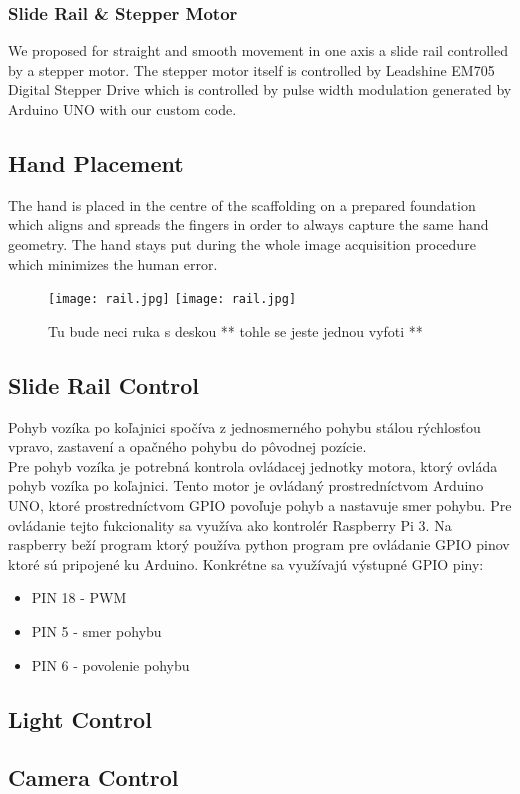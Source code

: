 \subsubsection*{Slide Rail \& Stepper Motor}
We proposed for straight and smooth movement in one axis a slide rail controlled by a stepper motor. The stepper motor itself is controlled by Leadshine EM705 Digital Stepper Drive which is controlled by pulse width modulation generated by Arduino UNO with our custom code.

\subsection{Hand Placement}
The hand is placed in the centre of the scaffolding on a prepared foundation which aligns and spreads the fingers in order to always capture the same hand geometry. The hand stays put during the whole image acquisition procedure which minimizes the human error.

\begin{figure}[h]
    \label{fig:rail}
    \texttt{[image: rail.jpg]}
    \texttt{[image: rail.jpg]}
    \caption{Tu bude neci ruka s deskou ** tohle se jeste jednou vyfoti **}
\end{figure}


\subsection{Slide Rail Control}
Pohyb vozíka po koľajnici spočíva z jednosmerného pohybu stálou rýchlosťou vpravo, zastavení a opačného pohybu do pôvodnej pozície. \\
Pre pohyb vozíka je potrebná kontrola ovládacej jednotky motora, ktorý ovláda pohyb vozíka po koľajnici. Tento motor je ovládaný prostredníctvom Arduino UNO, ktoré prostredníctvom GPIO povoľuje pohyb a nastavuje smer pohybu. Pre ovládanie tejto fukcionality sa využíva ako kontrolér Raspberry Pi 3. Na raspberry beží program ktorý používa python program pre ovládanie GPIO pinov ktoré sú pripojené ku Arduino. Konkrétne sa využívajú výstupné GPIO piny:
\begin{itemize}
    \item PIN 18 - PWM
    \item PIN  5 - smer pohybu
    \item PIN  6 - povolenie pohybu
\end{itemize}


\subsection{Light Control}
\subsection{Camera Control}
